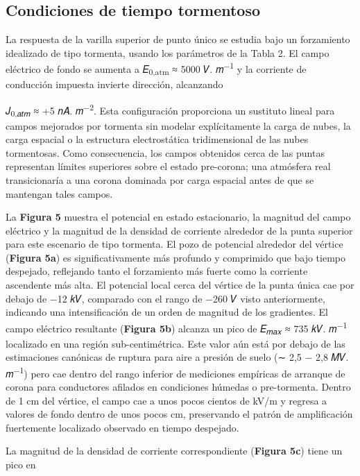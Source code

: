 \documentclass[
]{article}
\begin{document}
\subsection{Condiciones de tiempo
tormentoso}\label{condiciones-de-tiempo-tormentoso}

La respuesta de la varilla superior de punto único se estudia bajo un
forzamiento idealizado de tipo tormenta, usando los parámetros de la
Tabla 2. El campo eléctrico de fondo se aumenta a 𝐸\textsubscript{0,atm}
≈ 5000 𝑉. 𝑚\textsuperscript{−1} y la corriente de conducción impuesta
invierte dirección, alcanzando

𝐽\textsubscript{0,𝑎𝑡𝑚} ≈ +5 𝑛𝐴. 𝑚\textsuperscript{−2}. Esta
configuración proporciona un sustituto lineal para campos mejorados por
tormenta sin modelar explícitamente la carga de nubes, la carga espacial
o la estructura electrostática tridimensional de las nubes tormentosas.
Como consecuencia, los campos obtenidos cerca de las puntas representan
límites superiores sobre el estado pre-corona; una atmósfera real
transicionaría a una corona dominada por carga espacial antes de que se
mantengan tales campos.

La \textbf{Figura 5} muestra el potencial en estado estacionario, la
magnitud del campo eléctrico y la magnitud de la densidad de corriente
alrededor de la punta superior para este escenario de tipo tormenta. El
pozo de potencial alrededor del vértice (\textbf{Figura 5a}) es
significativamente más profundo y comprimido que bajo tiempo despejado,
reflejando tanto el forzamiento más fuerte como la corriente ascendente
más alta. El potencial local cerca del vértice de la punta única cae por
debajo de −12 𝑘𝑉, comparado con el rango de −260 𝑉 visto anteriormente,
indicando una intensificación de un orden de magnitud de los gradientes.
El campo eléctrico resultante (\textbf{Figura 5b}) alcanza un pico de
𝐸\textsubscript{𝑚𝑎𝑥} ≈ 735 𝑘𝑉. 𝑚\textsuperscript{−1} localizado en una
región sub-centimétrica. Este valor aún está por debajo de las
estimaciones canónicas de ruptura para aire a presión de suelo (∼ 2,5 −
2,8 𝑀𝑉. 𝑚\textsuperscript{−1}) pero cae dentro del rango inferior de
mediciones empíricas de arranque de corona para conductores afilados en
condiciones húmedas o pre-tormenta. Dentro de 1 cm del vértice, el campo
cae a unos pocos cientos de kV/m y regresa a valores de fondo dentro de
unos pocos cm, preservando el patrón de amplificación fuertemente
localizado observado en tiempo despejado.

La magnitud de la densidad de corriente correspondiente (\textbf{Figura
5c}) tiene un pico en
\end{document}
